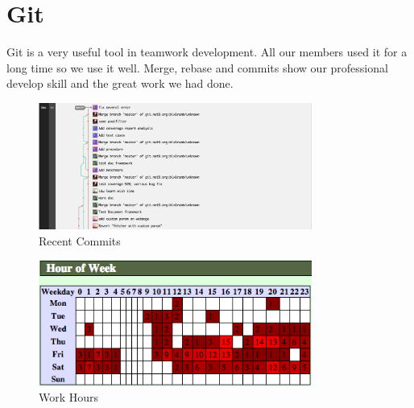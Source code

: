 \section{Git}
\label{sec:git}
  Git is a very useful tool in teamwork development. All our members used it for a long time so we use it well.
  Merge, rebase and commits show our professional develop skill and the great work we had done.
  \begin{figure}[H]
    \centering
    \includegraphics[width=0.8\textwidth]{figure/commits.png}
    \caption{Recent Commits\label{fig:commits}}
  \end{figure}
  \begin{figure}[H]
    \centering
    \includegraphics[width=0.8\textwidth]{figure/workhour.png}
    \caption{Work Hours\label{fig:workhour}}
  \end{figure}
